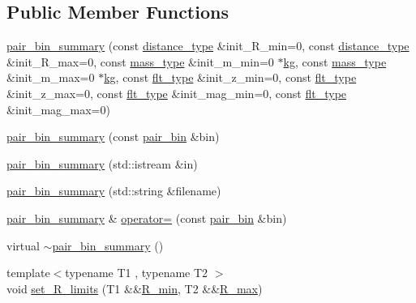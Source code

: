 \subsection*{Public Member Functions}
\begin{DoxyCompactItemize}
\item 
\hyperlink{classIceBRG_1_1pair__bin__summary_a25c4a1af9dd06f9194799604d5d6ea06}{pair\+\_\+bin\+\_\+summary} (const \hyperlink{namespaceIceBRG_a45499647eb87e24c10ab32c628711cec}{distance\+\_\+type} \&init\+\_\+\+R\+\_\+min=0, const \hyperlink{namespaceIceBRG_a45499647eb87e24c10ab32c628711cec}{distance\+\_\+type} \&init\+\_\+\+R\+\_\+max=0, const \hyperlink{namespaceIceBRG_a1be72ac4918a9b029f2eefa084213e35}{mass\+\_\+type} \&init\+\_\+m\+\_\+min=0 $\ast$\hyperlink{namespaceIceBRG_a9233960f6792ea35145d7db55c13e85d}{kg}, const \hyperlink{namespaceIceBRG_a1be72ac4918a9b029f2eefa084213e35}{mass\+\_\+type} \&init\+\_\+m\+\_\+max=0 $\ast$\hyperlink{namespaceIceBRG_a9233960f6792ea35145d7db55c13e85d}{kg}, const \hyperlink{lib_2IceBRG__main_2common_8h_ad0f130a56eeb944d9ef2692ee881ecc4}{flt\+\_\+type} \&init\+\_\+z\+\_\+min=0, const \hyperlink{lib_2IceBRG__main_2common_8h_ad0f130a56eeb944d9ef2692ee881ecc4}{flt\+\_\+type} \&init\+\_\+z\+\_\+max=0, const \hyperlink{lib_2IceBRG__main_2common_8h_ad0f130a56eeb944d9ef2692ee881ecc4}{flt\+\_\+type} \&init\+\_\+mag\+\_\+min=0, const \hyperlink{lib_2IceBRG__main_2common_8h_ad0f130a56eeb944d9ef2692ee881ecc4}{flt\+\_\+type} \&init\+\_\+mag\+\_\+max=0)
\item 
\hyperlink{classIceBRG_1_1pair__bin__summary_a832ae0f4e36a7850560597b91ef5745f}{pair\+\_\+bin\+\_\+summary} (const \hyperlink{classIceBRG_1_1pair__bin}{pair\+\_\+bin} \&bin)
\item 
\hyperlink{classIceBRG_1_1pair__bin__summary_a4d91275cda5af40a8de4607df904f318}{pair\+\_\+bin\+\_\+summary} (std\+::istream \&in)
\item 
\hyperlink{classIceBRG_1_1pair__bin__summary_a0aaf039eef5a7173408bcf95dbaa3426}{pair\+\_\+bin\+\_\+summary} (std\+::string \&filename)
\item 
\hyperlink{classIceBRG_1_1pair__bin__summary}{pair\+\_\+bin\+\_\+summary} \& \hyperlink{classIceBRG_1_1pair__bin__summary_a7465f0e34354fc97d706ba3c0365e0a5}{operator=} (const \hyperlink{classIceBRG_1_1pair__bin}{pair\+\_\+bin} \&bin)
\item 
virtual \hyperlink{classIceBRG_1_1pair__bin__summary_a6a9e88649e3a606a08577205f342cf1a}{$\sim$pair\+\_\+bin\+\_\+summary} ()
\item 
{\footnotesize template$<$typename T1 , typename T2 $>$ }\\void \hyperlink{classIceBRG_1_1pair__bin__summary_a5b5dc0fc4077d5dd7b7dafbdab684661}{set\+\_\+\+R\+\_\+limits} (T1 \&\&\hyperlink{classIceBRG_1_1pair__bin__summary_af1ee4f7eeb70c23843a0ad4af2f41ef9}{R\+\_\+min}, T2 \&\&\hyperlink{classIceBRG_1_1pair__bin__summary_a26bb6d459f592d9ff9f4a11255d5884b}{R\+\_\+max})

\end{DoxyCompactItemize}
